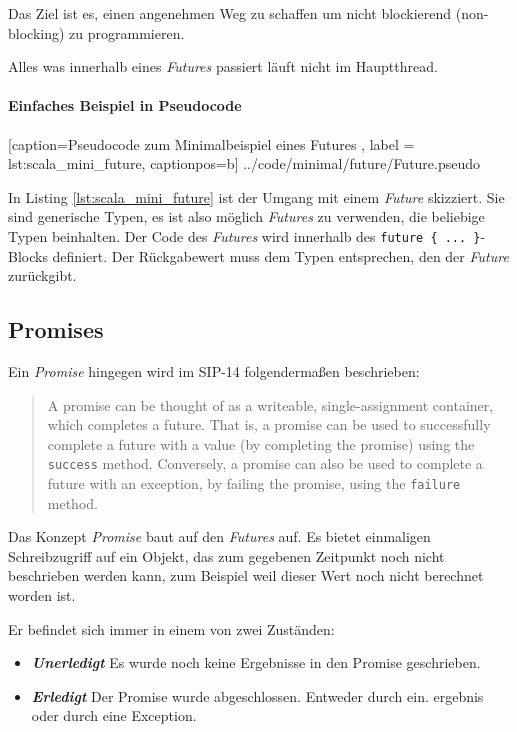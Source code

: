 Das Ziel ist es, einen angenehmen Weg zu schaffen um nicht
blockierend (\glqq non-blocking\grqq{}) zu programmieren.

Alles was innerhalb eines \emph{Futures} passiert läuft nicht im
Hauptthread.

\paragraph{Einfaches Beispiel in Pseudocode}


    [caption={Pseudocode zum Minimalbeispiel eines Futures },
       label = lst:scala_mini_future,
       captionpos=b]
 {../code/minimal/future/Future.pseudo}
 
In Listing \ref{lst:scala_mini_future} ist der Umgang mit einem \emph{Future}
skizziert. Sie sind generische Typen, es ist also möglich \emph{Futures}
zu verwenden, die beliebige Typen beinhalten. Der Code des \emph{Futures}
wird innerhalb des \texttt{future \{ ... \}}-Blocks definiert. Der
Rückgabewert muss dem Typen entsprechen, den der \emph{Future} zurückgibt.

\subsection{Promises}

Ein \emph{Promise} hingegen wird im SIP-14 folgendermaßen beschrieben:
\begin{quote}
A promise can be thought of as a writeable, single-assignment container, which 
completes a future. That is, a promise can be used to successfully complete a 
future with a value (by \glqq completing\grqq{} the promise) using the \texttt{success} method. 
Conversely, a promise can also be used to complete a future with an exception, 
by failing the promise, using the \texttt{failure} method.
\end{quote}

Das Konzept \emph{Promise} baut auf den \emph{Futures} auf. Es bietet
einmaligen Schreibzugriff auf ein Objekt, das zum gegebenen Zeitpunkt
noch nicht beschrieben werden kann, zum Beispiel weil dieser Wert
noch nicht berechnet worden ist.

Er befindet sich immer in einem von zwei Zuständen:
\begin{itemize}
 \item{\textbf{\emph{Unerledigt}} Es wurde noch keine Ergebnisse in den Promise geschrieben.}
 \item{\textbf{\emph{Erledigt}} Der Promise wurde abgeschlossen. Entweder durch ein.}
 ergebnis oder durch eine Exception.
\end{itemize}


